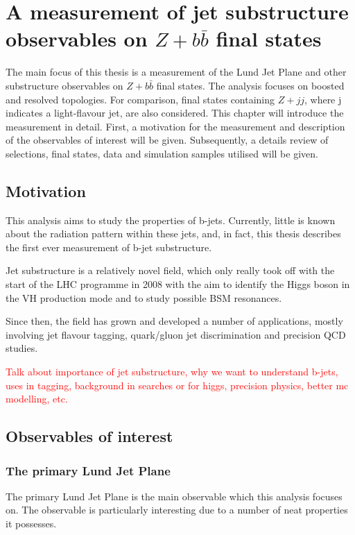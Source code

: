 \documentclass[10pt,a4paper]{book}
\author{Alberto Rescia}
\begin{document}
\chapter{A measurement of jet substructure observables on $Z+b\bar{b}$ final states}

The main focus of this thesis is a measurement of the Lund Jet Plane and other substructure observables on $Z+b\bar{b}$ final states. The analysis focuses on boosted and resolved topologies. For comparison, final states containing $Z+jj$, where j indicates a light-flavour jet, are also considered. This chapter will introduce the measurement in detail. First, a motivation for the measurement and description of the observables of interest will be given. Subsequently, a details review of selections, final states, data and simulation samples utilised will be given. 

\section{Motivation}

This analysis aims to study the properties of b-jets. Currently, little is known about the radiation pattern within these jets, and, in  fact, this thesis describes the first ever measurement of b-jet substructure. 

Jet substructure is a relatively novel field, which only really took off with the start of the LHC programme in 2008 with the aim to identify the Higgs boson in the VH production mode and to study possible BSM resonances. 

Since then, the field has grown and developed a number of applications, mostly involving jet flavour tagging, quark/gluon jet discrimination and precision QCD studies. 


\textcolor{red}{Talk about importance of jet substructure, why we want to understand b-jets, uses in tagging, background in searches or for higgs, precision physics, better mc modelling, etc.}


\section{Observables of interest}

\subsection{The primary Lund Jet Plane}

The primary Lund Jet Plane is the main observable which this analysis focuses on. The observable is particularly interesting due to a number of neat properties it possesses. 
\end{document}
